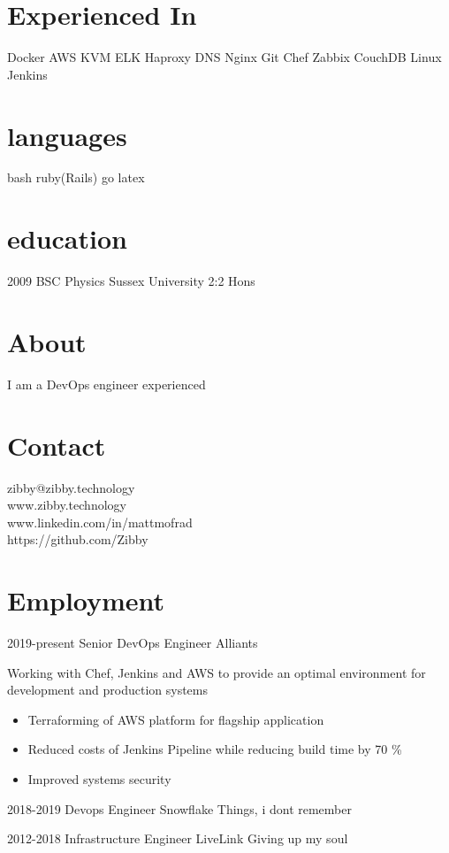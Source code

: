 \documentclass[]{friggeri-cv-a4}
\begin{document}

\begin{aside}
	\section{Experienced In}
    Docker
    AWS
    KVM
    ELK
    Haproxy
    DNS
    Nginx
    Git
    Chef
    Zabbix
    CouchDB
		Linux
		Jenkins
  \section{languages}
    bash
		ruby(Rails)
    go
    latex
  \section{education}
    2009 BSC Physics Sussex University 2:2 Hons
\end{aside}

\section{About}
I am a DevOps engineer experienced  

\section{Contact}
\faEnvelope\hspace{10pt}zibby@zibby.technology\\
\faGithub\hspace{10pt}www.zibby.technology \\
\faLinkedinSquare\hspace{10pt}www.linkedin.com/in/mattmofrad\\
\faGithub\hspace{10pt}https://github.com/Zibby\\

\section{Employment}
 \begin{entrylist}
  \entry
  	{2019-present}
  	{Senior DevOps Engineer}
  	{Alliants}
  	{Working with Chef, Jenkins and AWS to provide an optimal environment for development and production systems
      \begin{itemize}
        \item Terraforming of AWS platform for flagship application
        \item Reduced costs of Jenkins Pipeline while reducing build time by 70 \%
        \item Improved systems security 
      \end{itemize}}
  \entry 
  	{2018-2019}
  	{Devops Engineer}
  	{Snowflake}
  	{Things, i dont remember}
  
  \entry
  	{2012-2018}
  	{Infrastructure Engineer}
  	{LiveLink}
  	{Giving up my soul}
 \end{entrylist}
\end{document}
